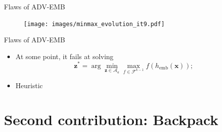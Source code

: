\documentclass[10pt]{beamer}
\newcommand{\femb}{h_{\mathrm{emb}}}
\newcommand{\fset}{\mathcal{F}}
\begin{document}
\begin{frame}{Flaws of ADV-EMB}
    \begin{figure}
        \texttt{[image: images/minmax\_evolution\_it9.pdf]}
    \end{figure}
\end{frame}


\begin{frame}{Flaws of ADV-EMB}
    \begin{itemize}
      
        
        \item At some point, it fails at solving  
        \begin{equation*}
            \mathbf{z}^\ast = \arg \min_{\mathbf{z} \in \mathcal{A}_a} \max_{f \in \fset^{k-1}} f(\femb(\mathbf{x}));
        \end{equation*} 
        
        \pause
          \item Heuristic
    \end{itemize}
\end{frame}


\section{Second contribution: Backpack}
\end{document}
